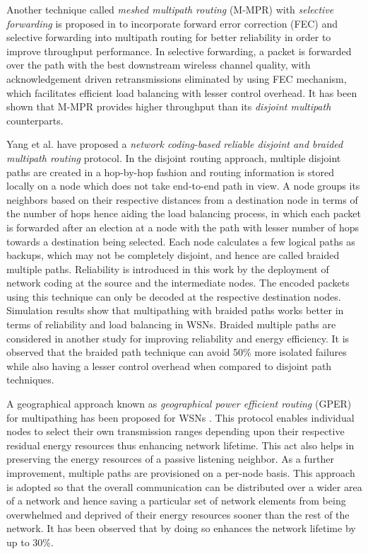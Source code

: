 \documentclass[10pt]{IEEEtran}
\begin{document}
Another technique called \textit{meshed multipath routing} (M-MPR) with \textit{selective forwarding} is proposed in \cite{de2003meshed, de2003WCNC} to incorporate forward error correction (FEC) and selective forwarding into multipath routing for better reliability in order to improve throughput performance. In selective forwarding, a packet is forwarded over the path with the best downstream wireless channel quality, with acknowledgement driven retransmissions eliminated by using FEC mechanism, which facilitates efficient load balancing with lesser control overhead. It has been shown that M-MPR provides higher throughput than its \textit{disjoint multipath} counterparts.

Yang et al. \cite{yang2010network} have proposed a \textit{network coding-based reliable disjoint and braided multipath routing} protocol. In the disjoint routing approach, multiple disjoint paths are created in a hop-by-hop fashion and routing information is stored locally on a node which does not take end-to-end path in view. A node groups its neighbors based on their respective distances from a destination node in terms of the number of hops hence aiding the load balancing process, in which each packet is forwarded after an election at a node with the path with lesser number of hops towards a destination being selected. Each node calculates a few logical paths as backups, which may not be completely disjoint, and hence are called braided multiple paths. Reliability is introduced in this work by the deployment of network coding at the source and the intermediate nodes. The encoded packets using this technique can only be decoded at the respective destination nodes. Simulation results show that multipathing with braided paths works better in terms of reliability and load balancing in WSNs. Braided multiple paths are considered in another study \cite{ganesan2001highly} for improving reliability and energy efficiency. It is observed that the braided path technique can avoid 50\% more isolated failures while also having a lesser control overhead when compared to disjoint path techniques.

A geographical approach known as \textit{geographical power efficient routing} (GPER) for multipathing has been proposed for WSNs \cite{wu2004gper}. This protocol enables individual nodes to select their own transmission ranges depending upon their respective residual energy resources thus enhancing network lifetime. This act also helps in preserving the energy resources of a passive listening neighbor. As a further improvement, multiple paths are provisioned on a per-node basis. This approach is adopted so that the overall communication can be distributed over a wider area of a network and hence saving a particular set of network elements from being overwhelmed and deprived of their energy resources sooner than the rest of the network. It has been observed that by doing so enhances the network lifetime by up to 30\%.
\end{document}
